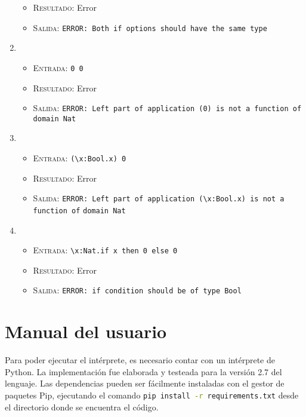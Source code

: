 \documentclass[11pt]{article}
\begin{document}
\begin{enumerate}
\begin{itemize}
    \item \textsc{Resultado:} Error
    \item \textsc{Salida:} \verb|ERROR: Both if options should have the same type|
    \end{itemize}
\item \begin{itemize}
    \item \textsc{Entrada:} \verb|0 0|
    \item \textsc{Resultado:} Error
    \item \textsc{Salida:} \verb|ERROR: Left part of application (0) is not a function of domain Nat|
    \end{itemize}
\item \begin{itemize}
    \item \textsc{Entrada:} \verb|(\x:Bool.x) 0|
    \item \textsc{Resultado:} Error
    \item \textsc{Salida:} \verb|ERROR: Left part of application (\x:Bool.x) is not a function of|
    	\verb|domain Nat|
    \end{itemize}
\item \begin{itemize}
    \item \textsc{Entrada:} \verb|\x:Nat.if x then 0 else 0|
    \item \textsc{Resultado:} Error
    \item \textsc{Salida:} \verb|ERROR: if condition should be of type Bool|
    \end{itemize}
\end{enumerate}


\section{Manual del usuario}


Para poder ejecutar el intérprete, es necesario contar con un intérprete de
Python. La implementación fue elaborada y testeada para la versión 2.7 del
lenguaje. Las dependencias pueden ser fácilmente instaladas con el gestor de
paquetes Pip, ejecutando el comando \lstinline[language=bash]
{pip install -r requirements.txt} desde el directorio donde se encuentra el
código.
\end{document}
